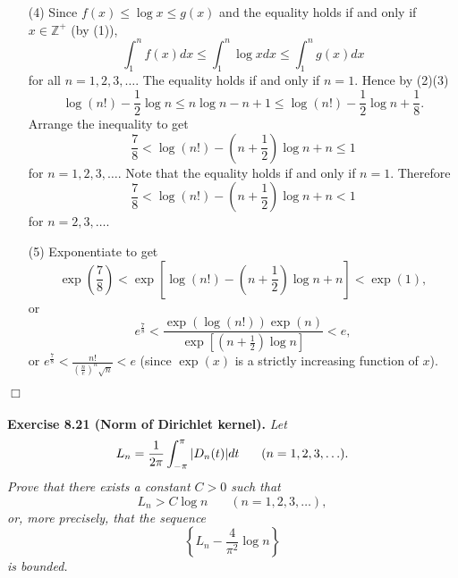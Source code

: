 \documentclass{article}
\begin{document}
\begin{enumerate}
\item[(4)]
Since $f(x) \leq \log x \leq g(x)$
and the equality holds if and only if $x \in \mathbb{Z}^+$ (by (1)),
\[
  \int_{1}^{n} f(x)dx \leq \int_{1}^{n} \log x dx \leq \int_{1}^{n} g(x)dx
\]
for all $n = 1,2,3,\ldots$. The equality holds if and only if $n=1$.
Hence by (2)(3)
\[
  \log(n!) - \frac{1}{2} \log n
  \leq n \log n - n + 1
  \leq \log(n!) - \frac{1}{2} \log n + \frac{1}{8}.
\]
Arrange the inequality to get
\[
  \frac{7}{8} < \log(n!) - \left(n+\frac{1}{2}\right) \log n + n \leq 1
\]
for $n = 1,2,3,\ldots$.
Note that the equality holds if and only if $n = 1$.
Therefore
\[
  \frac{7}{8} < \log(n!) - \left(n+\frac{1}{2}\right) \log n + n < 1
\]
for $n = 2,3,\ldots$.

\item[(5)]
Exponentiate to get
\[
  \exp(\frac{7}{8}) < \exp[\log(n!) - \left(n+\frac{1}{2}\right) \log n + n] < \exp(1),
\]
or
\[
  e^\frac{7}{8} < \frac{\exp(\log(n!))\exp(n)}{\exp[\left(n+\frac{1}{2}\right) \log n]} < e,
\]
or $e^{\frac{7}{8}} < \frac{n!}{(\frac{n}{e})^n \sqrt{n}} < e$
(since $\exp(x)$ is a strictly increasing function of $x$).
\end{enumerate}
$\Box$ \\\\









\textbf{Exercise 8.21 (Norm of Dirichlet kernel).}
\emph{Let
\[
  L_n = \frac{1}{2\pi} \int_{-\pi}^{\pi} \abs{ D_n(t) } dt
  \:\:\:\:\:\:\:\: (n = 1,2,3,\ldots).
\]
Prove that there exists a constant $C > 0$ such that
\[
  L_n > C \log n
  \:\:\:\:\:\:\:\: (n = 1,2,3,\ldots),
\]
or, more precisely, that the sequence
\[
  \left\{ L_n - \frac{4}{\pi^2} \log n \right\}
\]
is bounded.} \\
\end{document}
